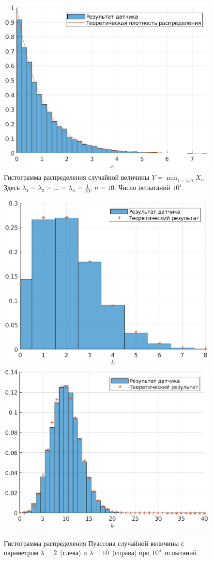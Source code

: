 \begin{figure}[h]
        \includegraphics[width=\linewidth]{task_03/min-01-10-10000.eps}
        \caption{Гистограмма распределения случайной величины $Y = \min_{i = \overline{1, n}} X_i$. Здесь $\lambda_1 = \lambda_2 = \ldots = \lambda_n = \frac{1}{10}$, $n = 10$. Число испытаний $10^4$.}
\end{figure}
\begin{figure}[h]
        \includegraphics[width=0.5\linewidth]{task_03/pois2-10000.eps}
        \includegraphics[width=0.5\linewidth]{task_03/pois10-10000.eps}
        \caption{Гистограмма распределения Пуассона случайной величины с параметром $\lambda = 2$~(слева) и $\lambda = 10$~(справа) при $10^4$~испытаний.}
\end{figure}
